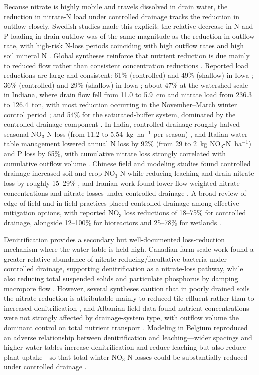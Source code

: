 Because nitrate is highly mobile and travels dissolved in drain water, the
reduction in nitrate-N load under controlled drainage tracks the reduction in
outflow closely. Swedish studies made this explicit: the relative decrease in N
and P loading in drain outflow was of the same magnitude as the reduction in
outflow rate, with high-risk N-loss periods coinciding with high outflow rates
and high soil mineral N \parencite{Wesström2007}. Global syntheses reinforce
that nutrient reduction is due mainly to reduced flow rather than consistent
concentration reductions \parencite{Frankenberger2024,Wang2020c}. Reported
load reductions are large and consistent: 61\% (controlled) and 49\% (shallow)
in Iowa \parencite{Schott2017}; 36\% (controlled) and 29\% (shallow) in Iowa
\parencite{Helmers2012}; about 47\% at the watershed scale in Indiana, where
drain flow fell from 11.0 to 5.9~cm and nitrate load from 236.3 to 126.4~ton,
with most reduction occurring in the November--March winter control period
\parencite{Ale2012}; and 54\% for the saturated-buffer system, dominated by the
controlled-drainage component \parencite{Ghane2025}. In India, controlled
drainage roughly halved seasonal NO$_3$-N loss (from 11.2 to
5.54~kg~ha$^{-1}$ per season) \parencite{Karegoudar2019}, and Italian water-table
management lowered annual N loss by 92\% (from 29 to 2~kg NO$_3$-N~ha$^{-1}$) and
P loss by 65\%, with cumulative nitrate loss strongly correlated with cumulative
outflow volume \parencite{Tolomio2018}. Chinese field and modeling studies found
controlled drainage increased soil and crop NO$_3$-N while reducing leaching and
drain nitrate loss by roughly 15--29\% \parencite{Dou2021,Dou2023}, and Iranian
work found lower flow-weighted nitrate concentrations and nitrate losses under
controlled drainage \parencite{Jouni2018}. A broad review of edge-of-field and
in-field practices placed controlled drainage among effective mitigation
options, with reported NO$_3$ loss reductions of 18--75\% for controlled
drainage, alongside 12--100\% for bioreactors and 25--78\% for wetlands
\parencite{Castellano2019}.

Denitrification provides a secondary but well-documented loss-reduction
mechanism where the water table is held high. Canadian farm-scale work found a
greater relative abundance of nitrate-reducing/facultative bacteria under
controlled drainage, supporting denitrification as a nitrate-loss pathway, while
also reducing total suspended solids and particulate phosphorus by damping
macropore flow \parencite{Tanga2025}. However, several syntheses caution that in
poorly drained soils the nitrate reduction is attributable mainly to reduced
tile effluent rather than to increased denitrification \parencite{THOMAS1995},
and Albanian field data found nutrient concentrations were not strongly affected
by drainage-system type, with outflow volume the dominant control on total
nutrient transport \parencite{Grazhdani1996}. Modeling in Belgium reproduced an
adverse relationship between denitrification and leaching---wider spacings and
higher water tables increase denitrification and reduce leaching but also reduce
plant uptake---so that total winter NO$_3$-N losses could be substantially
reduced under controlled drainage \parencite{ElSadek2002,ElSadek2002b}.

